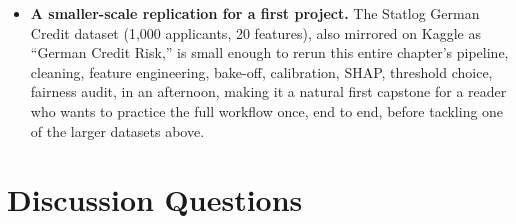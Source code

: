 \documentclass[../ai_in_finance]{subfiles}
\begin{document}
\begin{itemize}
    \item \textbf{A smaller-scale replication for a first project.} The Statlog German Credit dataset (1,000 applicants, 20 features), also mirrored on Kaggle as ``German Credit Risk,'' is small enough to rerun this entire chapter's pipeline, cleaning, feature engineering, bake-off, calibration, SHAP, threshold choice, fairness audit, in an afternoon, making it a natural first capstone for a reader who wants to practice the full workflow once, end to end, before tackling one of the larger datasets above.
\end{itemize}

\section{Discussion Questions}
\end{document}
